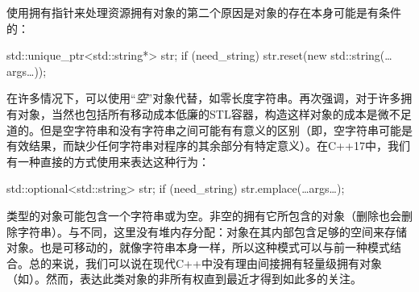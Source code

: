 使用拥有指针来处理资源拥有对象的第二个原因是对象的存在本身可能是有条件的：

\begin{code}
std::unique_ptr<std::string*> str;
if (need_string) str.reset(new std::string(…args…));
\end{code}

在许多情况下，可以使用“\emph{空}”对象代替，如零长度字符串。再次强调，对于许多拥有对象，当然也包括所有移动成本低廉的STL容器，构造这样对象的成本是微不足道的。但是空字符串和没有字符串之间可能有有意义的区别（即，空字符串可能是有效结果，而缺少任何字符串对程序的其余部分有特定意义）。在C++17中，我们有一种直接的方式使用来表达这种行为：

\begin{code}
std::optional<std::string> str;
if (need_string) str.emplace(…args…);
\end{code}

类型的对象可能包含一个字符串或为空。非空的拥有它所包含的对象（删除也会删除字符串）。与不同，这里没有堆内存分配：对象在其内部包含足够的空间来存储对象。也是可移动的，就像字符串本身一样，所以这种模式可以与前一种模式结合。总的来说，我们可以说在现代C++中没有理由间接拥有轻量级拥有对象（如）。然而，表达此类对象的非所有权直到最近才得到如此多的关注。

